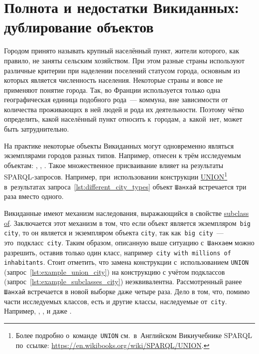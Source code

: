 \section{Полнота и недостатки Викиданных: дублирование объектов}
\label{sect:city-completness}

Городом принято называть крупный населённый пункт, 
жители которого, как правило, не заняты сельским хозяйством. 
При этом разные страны используют различные критерии 
при наделении поселений статусом города, 
основным из которых является численность населения. 
Некоторые страны и вовсе не применяют понятие города. 
Так, во Франции используется только одна географическая единица подобного рода~--- коммуна, 
вне зависимости от количества проживающих в ней людей и рода их деятельности. 
Поэтому чётко определить, какой населённый пункт относить к~городам, а~какой~нет, 
может быть затруднительно.

На практике некоторые объекты Викиданных могут одновременно являться экземплярами городов разных типов. 
Например,  отнесен к трём исследуемым объектам: 
, , . 
Такое множественное присваивание влияет на результаты SPARQL-запросов. 
Например, 
при~использовании конструкции \href{https://en.wikibooks.org/wiki/SPARQL/UNION}{UNION}\footnote[][-15pt]{%
%
    Более подробно о~команде~\texttt{UNION} 
    см.~в~Английском Викиучебнике SPARQL по~ссылке: \href{https://en.wikibooks.org/wiki/SPARQL/UNION}{https://en.wikibooks.org/wiki/SPARQL/UNION}.%
} %
в~результатах запроса~\ref{lst:different_city_types} 
объект \lstinline|Шанхай| встречается три раза вместо одного. 

Викиданные имеют механизм наследования, 
выражающийся в свойстве \href{https://www.wikidata.org/wiki/Property:P279}{subclass of}. 
Заключается этот механизм в том, что если объект является экземпляром\, \lstinline{big city}, 
то он является и экземпляром объекта \lstinline{city}, 
так как\, \lstinline|big city|~--- это~подкласс~\lstinline|city|. 
Таким образом, описанную выше ситуацию с~\lstinline|Шанхаем| можно разрешить, 
оставив только один класс, например\, \mbox{\lstinline{city with millions of inhabitants}}. 
Стоит отметить, что замена конструкции 
с~использованием \lstinline|UNION| (запрос~\ref{lst:example_union_city}) 
на конструкцию с учётом подклассов (запрос~\ref{lst:example_subclasses_city})
неэквивалентна. 
Рассмотренный ранее \lstinline|Шанхай| встречается в новой выборке даже четыре раза. 
Дело в том, что, помимо части исследуемых классов, есть и другие классы, наследуемые от~\lstinline|city|. 
Например, , 
, 
 и даже .

